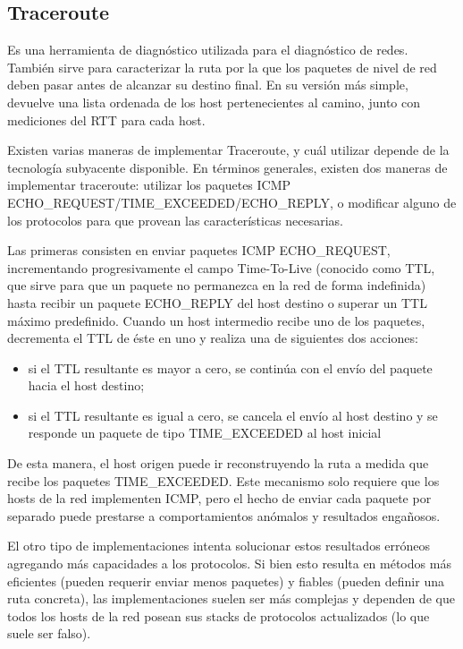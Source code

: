 \subsection{Traceroute}

Es una herramienta de diagnóstico utilizada para el diagnóstico de redes. También sirve para caracterizar la ruta por la que los paquetes de nivel de red deben pasar antes de alcanzar su destino final. En su versión más simple, devuelve una lista ordenada de los host pertenecientes al camino, junto con mediciones del RTT para cada host.

Existen varias maneras de implementar Traceroute, y cuál utilizar depende de la tecnología subyacente disponible. 
En términos generales, existen dos maneras de implementar traceroute: utilizar los paquetes ICMP ECHO\_REQUEST/TIME\_EXCEEDED/ECHO\_REPLY, o modificar alguno de los protocolos para que provean las características necesarias. 

Las primeras consisten en enviar paquetes ICMP ECHO\_REQUEST, incrementando progresivamente el campo Time-To-Live (conocido como TTL, que sirve para que un paquete no permanezca en la red de forma indefinida) hasta recibir un paquete ECHO\_REPLY del host destino o superar un TTL máximo predefinido. Cuando un host intermedio recibe uno de los paquetes, decrementa el TTL de éste en uno y realiza una de siguientes dos acciones:
\begin{itemize}
\item{si el TTL resultante es mayor a cero, se continúa con el envío del paquete hacia el host destino;}
\item{si el TTL resultante es igual a cero, se cancela el envío al host destino y se responde un paquete de tipo TIME\_EXCEEDED al host inicial}
 \end{itemize}

 De esta manera, el host origen puede ir reconstruyendo la ruta a medida que recibe los paquetes TIME\_EXCEEDED. Este mecanismo solo requiere que los hosts de la red implementen ICMP, pero el hecho de enviar cada paquete por separado puede prestarse a comportamientos anómalos y resultados engañosos.

El otro tipo de implementaciones intenta solucionar estos resultados erróneos agregando más capacidades a los protocolos. Si bien esto resulta en métodos más eficientes (pueden requerir enviar menos paquetes) y fiables (pueden definir una ruta concreta), las implementaciones suelen ser más complejas y dependen de que todos los hosts de la red posean sus stacks de protocolos actualizados (lo que suele ser falso).


